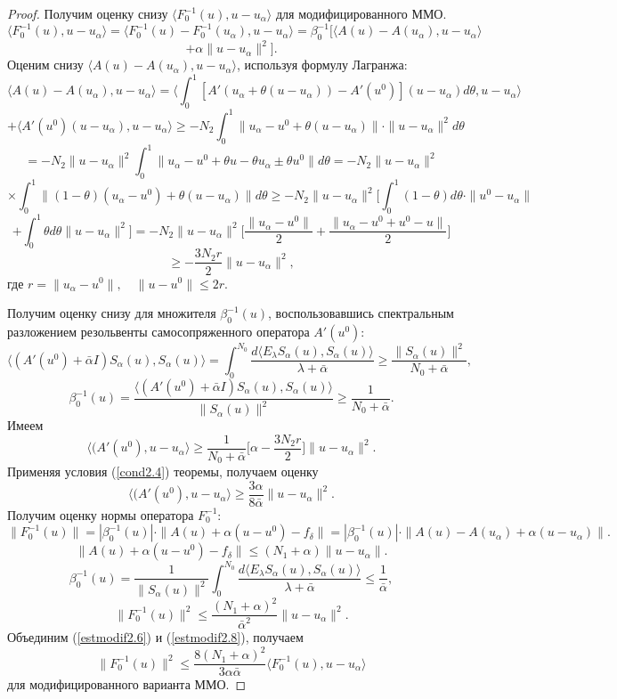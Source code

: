 \begin{proof} Получим оценку снизу $\langle F_0^{-1}(u),u-u_\alpha\rangle$ для модифицированного ММО.
$$\langle F_0^{-1}(u),u-u_\alpha\rangle=\langle F_0^{-1}(u)-F_0^{-1}(u_\alpha),u-u_\alpha\rangle=\beta_0^{-1}[\langle A(u)-A(u_\alpha),u-u_\alpha\rangle$$ $$+\alpha\|u-u_\alpha\|^2].$$
Оценим снизу $\langle A(u)-A(u_\alpha),u-u_\alpha\rangle$, используя формулу Лагранжа: $$\langle A(u)-A(u_\alpha),u-u_\alpha\rangle=\langle\int_{0}^{1}[A'(u_\alpha+\theta(u-u_\alpha))-A'(u^0)](u-u_\alpha)d\theta, u-u_\alpha\rangle$$ $$+\langle A'(u^0)(u-u_\alpha), u-u_\alpha\rangle\ge-N_2\int_{0}^{1}\|u_\alpha-u^0+\theta(u-u_\alpha)\|\cdot\|u-u_\alpha\|^2d\theta$$ $$=-N_2\|u-u_\alpha\|^2\int_{0}^{1}\|u_\alpha-u^0+\theta u-\theta u_\alpha\pm\theta u^0\|d\theta=-N_2\|u-u_\alpha\|^2$$
$$\times\int_{0}^{1}\|(1-\theta)(u_\alpha-u^0)+\theta(u-u_\alpha)\|d\theta\ge-N_2\|u-u_\alpha\|^2\Big[\int_{0}^{1}(1-\theta)d\theta\cdot\|u^0-u_\alpha\|$$$$+\int_{0}^{1}\theta d\theta\|u-u_\alpha\|^2\Big]=-N_2\|u-u_\alpha\|^2\Big[\frac{\|u_\alpha-u^0\|}{2}+\frac{\|u_\alpha-u^0+u^0-u\|}{2}\Big]$$
\begin{equation}\label{estmodif2.5}
\ge-\frac{3N_2r}{2}\|u-u_\alpha\|^2,
\end{equation}
где $r=\|u_\alpha-u^0\|,\quad \|u-u^0\|\le 2r$.

Получим оценку снизу для множителя $\beta_0^{-1}(u)$, воспользовавшись спектральным разложением резольвенты самосопряженного оператора $A'(u^0)$:
$$\langle (A'(u^0)+\bar{\alpha}I)S_\alpha(u), S_\alpha(u)\rangle=\int_{0}^{N_0}\frac{d\langle E_\lambda S_\alpha(u), S_\alpha(u)\rangle}{\lambda+\bar{\alpha}}\ge\frac{\|S_\alpha(u)\|^2}{N_0+\bar{\alpha}},$$
$$\beta_0^{-1}(u)=\frac{\langle (A'(u^0)+\bar{\alpha}I)S_\alpha(u), S_\alpha(u)\rangle}{\|S_\alpha(u)\|^2}\ge\frac{1}{N_0+\bar{\alpha}}.$$ 
Имеем $$\langle (A'(u^0), u-u_\alpha\rangle\ge\frac{1}{N_0+\bar{\alpha}}\Big[\alpha-\frac{3N_2r}{2}\Big]\|u-u_\alpha\|^2.$$
Применяя условия (\ref{cond2.4}) теоремы, получаем оценку
\begin{equation}\label{estmodif2.6}
\langle (A'(u^0), u-u_\alpha\rangle\ge\frac{3\alpha}{8\bar{\alpha}}\|u-u_\alpha\|^2.
\end{equation}
Получим оценку нормы оператора $F_0^{-1}$:
$$\|F_0^{-1}(u)\|=|\beta_0^{-1}(u)|\cdot\|A(u)+\alpha(u-u^0)-f_\delta\|=|\beta_0^{-1}(u)|\cdot\|A(u)-A(u_\alpha)+\alpha(u-u_\alpha)\|.$$
\begin{equation}\label{estmodif2.7}
\|A(u)+\alpha(u-u^0)-f_\delta\|\le(N_1+\alpha)\|u-u_\alpha\|.
\end{equation}
$$\beta_0^{-1}(u)=\frac{1}{\|S_\alpha(u)\|^2}\int_{0}^{N_0}\frac{d\langle E_\lambda S_\alpha(u), S_\alpha(u)\rangle}{\lambda + \bar{\alpha}}\le\frac{1}{\bar{\alpha}},$$
\begin{equation}\label{estmodif2.8}
\|F_0^{-1}(u)\|^2\le\frac{(N_1+\alpha)^2}{\bar{\alpha}^2}\|u-u_\alpha\|^2.
\end{equation}
Объединим (\ref{estmodif2.6}) и (\ref{estmodif2.8}), получаем
$$\|F_0^{-1}(u)\|^2\le\frac{8(N_1+\alpha)^2}{3\alpha\bar{\alpha}}\langle F_0^{-1}(u), u-u_\alpha\rangle$$ для модифицированного варианта ММО.


\end{proof}
